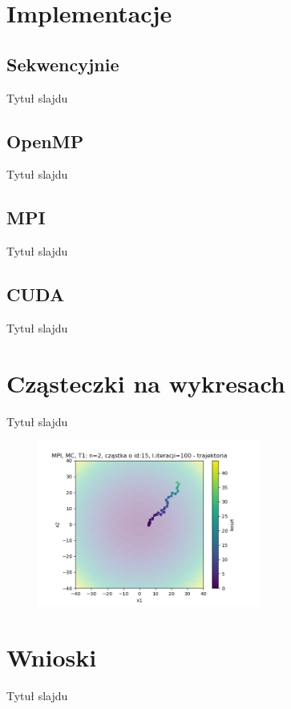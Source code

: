 \documentclass[handout]{beamer}
\begin{document}
\section{Implementacje}
\subsection{Sekwencyjnie}
\begin{frame}{Tytuł slajdu}
\end{frame}




\subsection{OpenMP}
\begin{frame}{Tytuł slajdu}
\end{frame}




\subsection{MPI}
\begin{frame}{Tytuł slajdu}
\end{frame}




\subsection{CUDA}
\begin{frame}{Tytuł slajdu}
\end{frame}



\section{Cząsteczki na wykresach}
\begin{frame}{Tytuł slajdu}
\begin{figure}[t]
\includegraphics[width=0.65\textwidth]{grafiki/MPI_ MC_T1_trajectory_id15.png}
\end{figure}
\end{frame}




\section{Wnioski}
\begin{frame}{Tytuł slajdu}
\end{frame}
\end{document}
